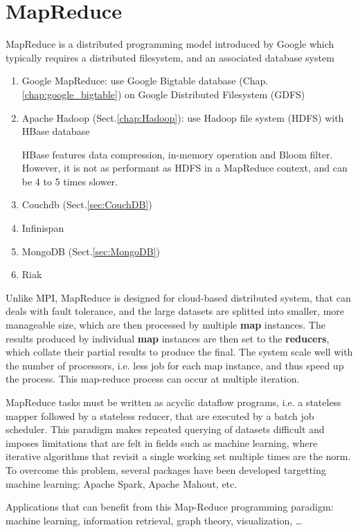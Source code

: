 \section{MapReduce}
\label{sec:MapReduce}

MapReduce is a distributed programming model introduced by Google which
typically requires a distributed filesystem, and an associated database system 
\begin{enumerate}
  \item Google MapReduce: use Google Bigtable database
  (Chap.\ref{chap:google_bigtable}) on Google Distributed Filesystem (GDFS)
  \item Apache Hadoop (Sect.\ref{chap:Hadoop}): use Hadoop file system (HDFS)
  with HBase database
  
  HBase features data compression, in-memory operation and Bloom filter.
  However, it is not as performant as HDFS in a MapReduce context, and can be 4
  to 5 times slower.

  \item Couchdb (Sect.\ref{sec:CouchDB})
  \item Infinispan
  \item MongoDB (Sect.\ref{sec:MongoDB})
  \item Riak
\end{enumerate}

Unlike MPI, MapReduce is designed for cloud-based distributed system, that can
deals with fault tolerance, and the large datasets are splitted into smaller,
more manageable size, which are then processed by multiple {\bf map} instances.
The results produced by individual {\bf map} instances are then set to the {\bf
reducers}, which collate their partial results to produce the final. 
The system scale well with the number of processors, i.e. less job for each map
instance, and thus speed up the process. This
map-reduce process can occur at multiple iteration. 

MapReduce tasks must be written as acyclic dataflow programs, i.e. a stateless
mapper followed by a stateless reducer, that are executed by a batch job
scheduler. This paradigm makes repeated querying of datasets difficult and
imposes limitations that are felt in fields such as machine learning, where
iterative algorithms that revisit a single working set multiple times are the
norm. To overcome this problem, several packages have been developed targetting
machine learning: Apache Spark, Apache Mahout, etc.

Applications that can benefit from this Map-Reduce programming paradigm:
machine learning, information retrieval, graph theory, visualization, \ldots

